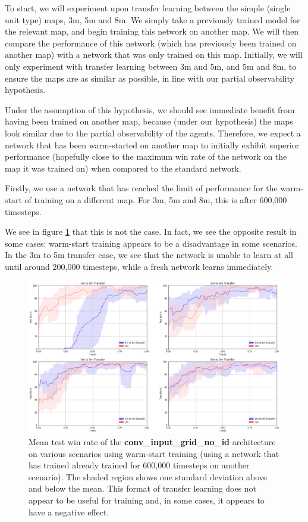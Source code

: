 To start, we will experiment upon transfer learning between the simple (single unit type) maps, 3m, 5m and 8m. We simply take a previously trained model for the relevant map, and begin training this network on another map. We will then compare the performance of this network (which has previously been trained on another map) with a network that was only trained on this map. Initially, we will only experiment with transfer learning between 3m and 5m, and 5m and 8m, to ensure the maps are as similar as possible, in line with our partial observability hypothesis.

Under the assumption of this hypothesis, we should see immediate benefit from having been trained on another map, because (under our hypothesis) the maps look similar due to the partial observability of the agents. Therefore, we expect a network that has been warm-started on another map to initially exhibit superior performance (hopefully close to the maximum win rate of the network on the map it was trained on) when compared to the standard network.


Firstly, we use a network that has reached the limit of performance for the warm-start of training on a different map. For 3m, 5m and 8m, this is after 600,000 timesteps.


We see in figure \ref{fig:transfer6} that this is not the case. In fact, we see the opposite result in some cases: warm-start training appears to be a disadvantage in some scenarios. In the 3m to 5m transfer case, we see that the network is unable to learn at all until around 200,000 timesteps, while a fresh network learns immediately.

\begin{figure}[h]
    \centering
    \hbox{\hspace{-5em}\includegraphics[width=1.2\textwidth]{images/graphs/6.png}}
    \caption{Mean test win rate of the \textbf{conv\_input\_grid\_no\_id} architecture on various scenarios using warm-start training (using a network that has trained already trained for 600,000 timesteps on another scenario). The shaded region shows one standard deviation above and below the mean. This format of transfer learning does not appear to be useful for training and, in some cases, it appears to have a negative effect. }
    \label{fig:transfer6}
\end{figure}



